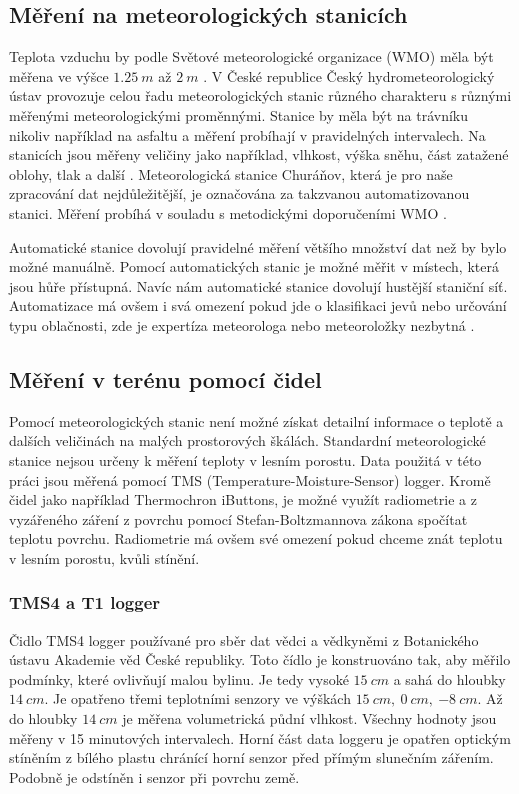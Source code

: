 \subsection{Měření na meteorologických stanicích}\label{chap:meteostations}
Teplota vzduchu by podle Světové meteorologické organizace (WMO) měla být měřena ve výšce $\SI{1.25}{m}$ až $\SI{2}{m}$ \parencite{wmo2021}. V České republice Český hydrometeorologický ústav provozuje celou řadu meteorologických stanic různého charakteru s různými měřenými meteorologickými proměnnými. Stanice by měla být na trávníku nikoliv například na asfaltu a měření probíhají v pravidelných intervalech. Na stanicích jsou měřeny veličiny jako například, vlhkost, výška sněhu, část zatažené oblohy, tlak a další \parencite{chmustanice}. Meteorologická stanice Churáňov, která je pro naše zpracování dat nejdůležitější, je označována za takzvanou automatizovanou stanici. Měření probíhá v souladu s metodickými doporučeními WMO \parencite{chmustanice2}.

Automatické stanice dovolují pravidelné měření většího množství dat než by bylo možné manuálně. Pomocí automatických stanic je možné měřit v místech, která jsou hůře přístupná. Navíc nám automatické stanice dovolují hustější staniční síť. Automatizace má ovšem i svá omezení pokud jde o klasifikaci jevů nebo určování typu oblačnosti, zde je expertíza meteorologa nebo meteoroložky nezbytná \parencite{automatisation}.

\subsection{Měření v terénu pomocí čidel}
Pomocí meteorologických stanic není možné získat detailní informace o teplotě a dalších veličinách na malých prostorových škálách. Standardní meteorologické stanice nejsou určeny k měření teploty v lesním porostu. Data použitá v této práci jsou měřená pomocí TMS (Temperature-Moisture-Sensor) logger. Kromě čidel jako například Thermochron iButtons, je možné využít radiometrie a z vyzářeného záření z povrchu pomocí Stefan-Boltzmannova zákona spočítat teplotu povrchu. Radiometrie má ovšem své omezení pokud chceme znát teplotu v lesním porostu, kvůli stínění. 

\subsubsection{TMS4 a T1 logger} \label{chap:loggers}
Čidlo TMS4 logger používané pro sběr dat vědci a vědkyněmi z Botanického ústavu Akademie věd České republiky. Toto čídlo je konstruováno tak, aby měřilo podmínky, které ovlivňují malou bylinu. Je tedy vysoké $\SI{15}{cm}$ a sahá do hloubky $\SI{14}{cm}$. Je opatřeno třemi teplotními senzory ve výškách $\SI{15}{cm},\ \SI{0}{cm},\ \SI{-8}{cm}$. Až do hloubky $\SI{14}{cm}$ je měřena volumetrická půdní vlhkost. Všechny hodnoty jsou měřeny v 15 minutových intervalech. Horní část data loggeru je opatřen optickým stíněním z bílého plastu chránící horní senzor před přímým slunečním zářením. Podobně je odstíněn i senzor při povrchu země. 

